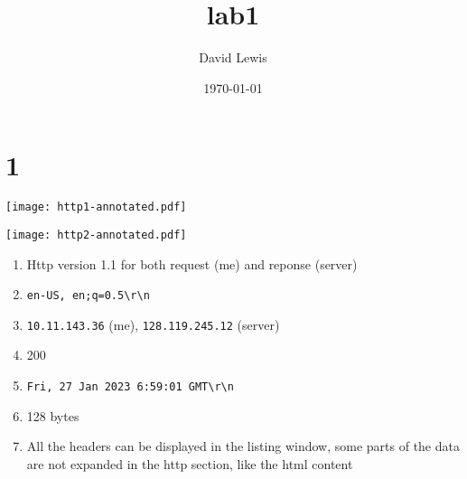 \documentclass[11pt]{article}
\author{David Lewis}
\date{\today}
\title{lab1}
\begin{document}
\maketitle
\section*{1}
\label{sec:org733205f}
\begin{center}
\texttt{[image: http1-annotated.pdf]}
\end{center}
\begin{center}
\texttt{[image: http2-annotated.pdf]}
\end{center}
\begin{enumerate}
\item Http version 1.1 for both request (me) and reponse (server)
\item \texttt{en-US, en;q=0.5\textbackslash{}r\textbackslash{}n}
\item \texttt{10.11.143.36} (me), \texttt{128.119.245.12} (server)
\item 200
\item \texttt{Fri, 27 Jan 2023 6:59:01 GMT\textbackslash{}r\textbackslash{}n}
\item 128 bytes
\item All the headers can be displayed in the listing window, some parts of the
data are not expanded in the http section, like the html content
\end{enumerate}
\end{document}
